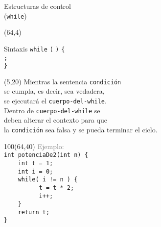 \documentclass[aspectratio=169]{beamer}
\begin{document}
\begin{frame}[fragile,t]{Estructuras de control\\ (\texttt{while})}
    \begin{textblock}{90}(64,4)
    \begin{block}{\small Sintaxis}
    \vspace{0.2cm}
    \scriptsize
    {\large \texttt{while}} {\large \texttt{(}}
     {\large \texttt{)}} {\large \texttt{\{}}\\ \vspace{0.2cm}
    \hspace{2cm}  {\large \texttt{;}}\\ \vspace{0.2cm}
    \hspace{1cm} {\large \texttt{\}}}
    \end{block}
    \end{textblock}
    \begin{textblock}{50}(5,20)
    \small
    Mientras la sentencia \texttt{condición}\\ se cumpla, es decir, sea vedadera,\\
    se ejecutará el \texttt{cuerpo-del-while}.\\
    \bigskip
    Dentro de \texttt{cuerpo-del-while} se\\ deben alterar el contexto para que\\ la \texttt{condición} sea falsa y se pueda terminar el ciclo.
    \end{textblock}
    \begin{textblock}{100}(64,40)
    \textcolor{gray}{Ejemplo:}\\
    \normalsize \verb|int potenciaDe2(int n) {|\\
    \normalsize \verb|    int t = 1;|\\
    \normalsize \verb|    int i = 0;|\\
    \normalsize \verb|    while( i != n ) {|\\
    \normalsize \verb|          t = t * 2;|\\
    \normalsize \verb|          i++;|\\
    \normalsize \verb|    }|\\
    \normalsize \verb|    return t;|\\
    \normalsize \verb|}|\\
    \end{textblock}
\end{frame}
\end{document}
